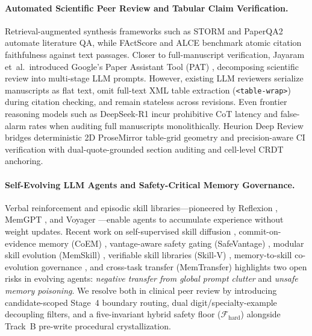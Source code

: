 \documentclass[11pt,a4paper]{article}
\begin{document}
\paragraph{Automated Scientific Peer Review and Tabular Claim Verification.}
Retrieval-augmented synthesis frameworks such as STORM \cite{shao2024storm} and PaperQA2 \cite{skarlinski2024paperqa2} automate literature QA, while FActScore \cite{min2023factscore} and ALCE \cite{gao2023alce} benchmark atomic citation faithfulness against text passages. Closer to full-manuscript verification, Jayaram et~al.\ introduced Google's Paper Assistant Tool (PAT) \cite{googlepat2026}, decomposing scientific review into multi-stage LLM prompts. However, existing LLM reviewers serialize manuscripts as flat text, omit full-text XML table extraction (\texttt{<table-wrap>}) during citation checking, and remain stateless across revisions. Even frontier reasoning models such as DeepSeek-R1 \cite{deepseekr1_2025} incur prohibitive CoT latency and false-alarm rates when auditing full manuscripts monolithically. Heurion Deep Review bridges deterministic 2D ProseMirror table-grid geometry and precision-aware CI verification with dual-quote-grounded section auditing and cell-level CRDT anchoring.

\paragraph{Self-Evolving LLM Agents and Safety-Critical Memory Governance.}
Verbal reinforcement and episodic skill libraries---pioneered by Reflexion \cite{shinn2023reflexion}, MemGPT \cite{packer2023memgpt}, and Voyager \cite{wang2023voyager}---enable agents to accumulate experience without weight updates. Recent work on self-supervised skill diffusion \cite{li2026skilltraining}, commit-on-evidence memory (CoEM) \cite{coem2026}, vantage-aware safety gating (SafeVantage) \cite{safevantage2026}, modular skill evolution (MemSkill) \cite{memskill2026}, verifiable skill libraries (Skill-V) \cite{skillv2026}, memory-to-skill co-evolution governance \cite{msce2026}, and cross-task transfer (MemTransfer) \cite{memtransfer2026} highlights two open risks in evolving agents: \emph{negative transfer from global prompt clutter} and \emph{unsafe memory poisoning}. We resolve both in clinical peer review by introducing candidate-scoped Stage~4 boundary routing, dual digit/specialty-example decoupling filters, and a five-invariant hybrid safety floor ($\mathcal{F}_{\text{hard}}$) alongside Track~B pre-write procedural crystallization.
\end{document}
